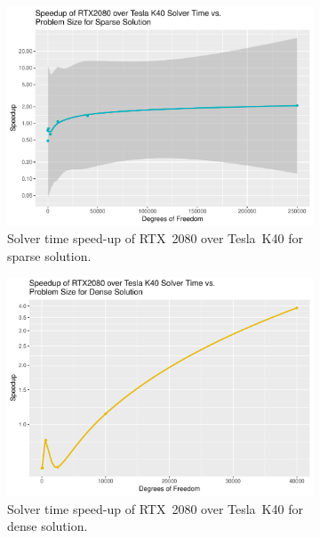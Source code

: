 \begin{figure}
	\centering
	\begin{subfigure}{0.48\linewidth}
		\centering
		\includegraphics[width = \linewidth]{Plots/solve_sparse_rtx_speedup_vs_n}
		\caption{Solver time speed-up of RTX~2080 over Tesla~K40 for sparse solution.}
		\label{fig:solve_rtx_sparse}
	\end{subfigure}\hfill
	\begin{subfigure}{0.48\linewidth}
		\centering
		\includegraphics[width=\linewidth]{Plots/solve_dense_rtx_speedup_vs_n}
		\caption{Solver time speed-up of RTX~2080 over Tesla~K40 for dense solution.}
		\label{fig:solve_rtx_dense}
	\end{subfigure}\\
	\begin{subfigure}{0.48\linewidth}

\end{subfigure}
\end{figure}
